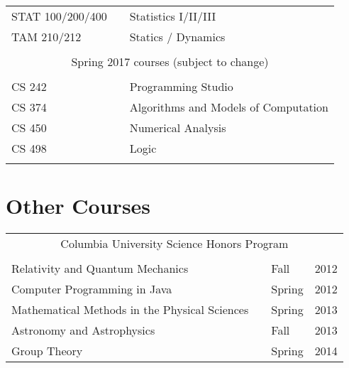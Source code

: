 \documentclass[10pt,letterpaper,sans]{moderncv}
\begin{document}
\begin{tabular}{l p{1in} l}
  STAT 100/200/400 & \hfill & Statistics I/II/III                   \\
  TAM 210/212      & \hfill & Statics / Dynamics                    \\
  \\
  \multicolumn{3}{c}{Spring 2017 courses (subject to change)} \\
  \\[3pt]
  CS 242           & \hfill & Programming Studio                    \\
  CS 374           & \hfill & Algorithms and Models of Computation  \\
  CS 450           & \hfill & Numerical Analysis                    \\
  CS 498           & \hfill & Logic                                 \\
  \\
\end{tabular}

\section{Other Courses}
\setlength{\tabcolsep}{10pt}
\begin{tabular}{l p{0.6in} l l}
  \\
  \multicolumn{4}{c}{Columbia University Science Honors Program} \\
  \\
  Relativity and Quantum Mechanics              & \hfill & Fall   & 2012 \\
  Computer Programming in Java                  & \hfill & Spring & 2012 \\
  Mathematical Methods in the Physical Sciences & \hfill & Spring & 2013 \\
  Astronomy and Astrophysics                    & \hfill & Fall   & 2013 \\
  Group Theory                                  & \hfill & Spring & 2014 \\
\end{tabular}
\end{document}
